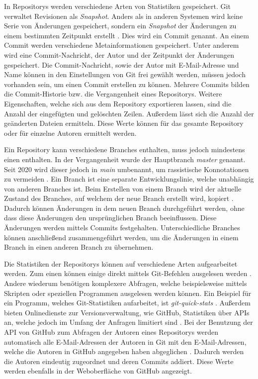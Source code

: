 In Repositorys werden verschiedene Arten von Statistiken gespeichert.
Git verwaltet Revisionen als \emph{Snapshot}.
Anders als in anderen Systemen wird keine Serie von Änderungen gespeichert, sondern ein \emph{Snapshot} der Änderungen zu einem bestimmten Zeitpunkt erstellt \autocite{ponuthorai_version_2022}.
Dies wird ein Commit genannt.
An einem Commit werden verschiedene Metainformationen gespeichert.
Unter anderem wird eine Commit-Nachricht, der Autor und der Zeitpunkt der Änderungen gespeichert.
Die Commit-Nachricht, sowie der Autor mit E-Mail-Adresse und Name können in den Einstellungen von Git frei gewählt werden, müssen jedoch vorhanden sein, um einen Commit erstellen zu können.
Mehrere Commits bilden die Commit-Historie bzw. die Vergangenheit eines Repositorys.
Weitere Eigenschaften, welche sich aus dem Repository exportieren lassen, sind die Anzahl der eingefügten und gelöschten Zeilen.
Außerdem lässt sich die Anzahl der geänderten Dateien ermitteln.
Diese Werte können für das gesamte Repository oder für einzelne Autoren ermittelt werden.

Ein Repository kann verschiedene Branches enthalten, muss jedoch mindestens einen enthalten.
In der Vergangenheit wurde der Hauptbranch \emph{master} genannt.
Seit 2020 wird dieser jedoch in \emph{main} umbenannt, um rassistische Konnotationen zu vermeiden \autocite{github_githubrenaming_2024}.
Ein Branch ist eine separate Entwicklungslinie, welche unabhängig von anderen Branches ist.
Beim Erstellen von einem Branch wird der aktuelle Zustand des Branches, auf welchem der neue Branch erstellt wird, kopiert \autocite{ponuthorai_version_2022}.
Dadurch können Änderungen in dem neuen Branch durchgeführt werden, ohne dass diese Änderungen den ursprünglichen Branch beeinflussen.
Diese Änderungen werden mittels Commits festgehalten.
Unterschiedliche Branches können anschließend zusammengeführt werden, um die Änderungen in einem Branch in einen anderen Branch zu übernehmen.

Die Statistiken der Repositorys können auf verschiedene Arten aufgearbeitet werden.
Zum einen können einige direkt mittels Git-Befehlen ausgelesen werden \autocite{chacon_git_2024}.
Andere wiederum benötigen komplexere Abfragen, welche beispielsweise mittels Skripten oder speziellen Programmen ausgelesen werden können.
Ein Beispiel für ein Programm, welches Git-Statistiken aufarbeitet, ist \emph{git-quick-stats} \autocite{mestan_git-quick-stats_2024}.
Außerdem bieten Onlinedienste zur Versionsverwaltung, wie GitHub, Statistiken über APIs an, welche jedoch im Umfang der Anfragen limitiert sind \autocite{github_rate_2022}.
Bei der Benutzung der API von GitHub zum Abfragen der Autoren eines Repositorys werden automatisch alle E-Mail-Adressen der Autoren in Git mit den E-Mail-Adressen, welche die Autoren in GitHub angegeben haben abgeglichen \autocite{github_rest-api-endpunkte_2022}.
Dadurch werden die Autoren eindeutig zugeordnet und deren Commits addiert.
Diese Werte werden ebenfalls in der Weboberfläche von GitHub angezeigt.

